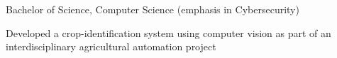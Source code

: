 \documentclass[10pt]{article}
\begin{document}

\begin{entryitems}
  \item Bachelor of Science, Computer Science (emphasis in Cybersecurity)
\end{entryitems}

\begin{entryitems}
  \item Developed a crop-identification system using computer vision as part of an interdisciplinary agricultural automation project
\end{entryitems}
\end{document}

